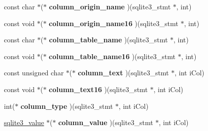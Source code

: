 \begin{DoxyCompactItemize}
\item 
\hypertarget{structsqlite3__api__routines_a6927f22bc705f4e518b1bc4a5d06a15d}{const char $\ast$($\ast$ {\bfseries column\-\_\-origin\-\_\-name} )(sqlite3\-\_\-stmt $\ast$, int)}\label{structsqlite3__api__routines_a6927f22bc705f4e518b1bc4a5d06a15d}

\item 
\hypertarget{structsqlite3__api__routines_ac2ae192edc01c361562796e873f33134}{const void $\ast$($\ast$ {\bfseries column\-\_\-origin\-\_\-name16} )(sqlite3\-\_\-stmt $\ast$, int)}\label{structsqlite3__api__routines_ac2ae192edc01c361562796e873f33134}

\item 
\hypertarget{structsqlite3__api__routines_a1fc9721d32d8d99d26a97cae6882c34a}{const char $\ast$($\ast$ {\bfseries column\-\_\-table\-\_\-name} )(sqlite3\-\_\-stmt $\ast$, int)}\label{structsqlite3__api__routines_a1fc9721d32d8d99d26a97cae6882c34a}

\item 
\hypertarget{structsqlite3__api__routines_af01a003033c1ce2c671e495d35cf00eb}{const void $\ast$($\ast$ {\bfseries column\-\_\-table\-\_\-name16} )(sqlite3\-\_\-stmt $\ast$, int)}\label{structsqlite3__api__routines_af01a003033c1ce2c671e495d35cf00eb}

\item 
\hypertarget{structsqlite3__api__routines_a958266b11061644abc6a542b30c0dded}{const unsigned char $\ast$($\ast$ {\bfseries column\-\_\-text} )(sqlite3\-\_\-stmt $\ast$, int i\-Col)}\label{structsqlite3__api__routines_a958266b11061644abc6a542b30c0dded}

\item 
\hypertarget{structsqlite3__api__routines_a1e92761b9b7068a45dcb576229d1995a}{const void $\ast$($\ast$ {\bfseries column\-\_\-text16} )(sqlite3\-\_\-stmt $\ast$, int i\-Col)}\label{structsqlite3__api__routines_a1e92761b9b7068a45dcb576229d1995a}

\item 
\hypertarget{structsqlite3__api__routines_a1bfa18703e814caf9b940bd89247fde5}{int($\ast$ {\bfseries column\-\_\-type} )(sqlite3\-\_\-stmt $\ast$, int i\-Col)}\label{structsqlite3__api__routines_a1bfa18703e814caf9b940bd89247fde5}

\item 
\hypertarget{structsqlite3__api__routines_a2c5ab2f4eb5458dd17922e6ad6f33ca3}{\hyperlink{struct_mem}{sqlite3\-\_\-value} $\ast$($\ast$ {\bfseries column\-\_\-value} )(sqlite3\-\_\-stmt $\ast$, int i\-Col)}\label{structsqlite3__api__routines_a2c5ab2f4eb5458dd17922e6ad6f33ca3}


\end{DoxyCompactItemize}
